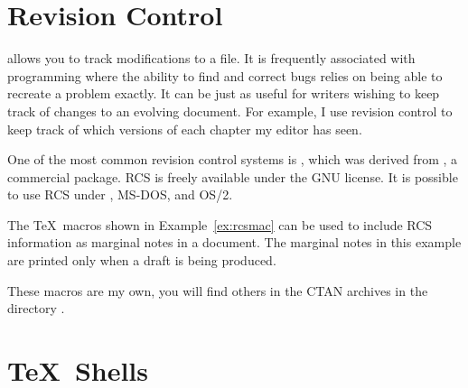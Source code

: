 \section{Revision Control}

 allows you 
to track modifications to a file.  
It is frequently associated with programming where the ability to 
find and correct bugs relies on being able to recreate a
problem exactly.  It can be just as useful for writers wishing to keep
track of changes to an evolving document.  For example, I use
revision control to keep track of which versions of each chapter
my editor has seen.

One of the most common revision control systems is , which was
derived from , a commercial package.  RCS is freely available under
the GNU license.  It is possible to use RCS under \Unix, MS-DOS, and
OS/2.

The \TeX\ macros shown in Example~\ref{ex:rcsmac} can be used to
include RCS information as marginal notes in a document.  The
marginal notes in this example are printed only when a draft
is being produced.

These macros are my own, you will find others in the CTAN archives
in the directory .


\section{\protect\TeX\ Shells}

